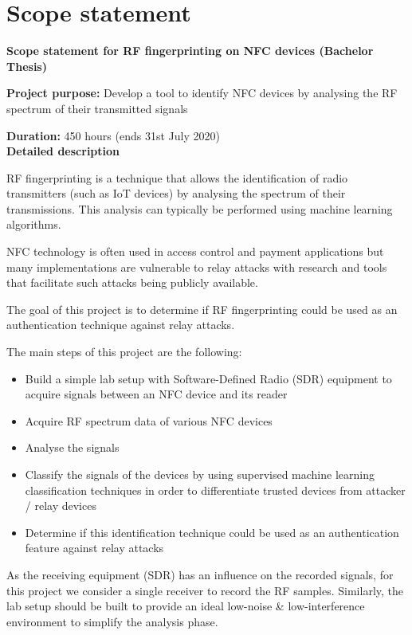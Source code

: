 \section{Scope statement}
{\Large \textbf{Scope statement for RF fingerprinting on NFC devices (Bachelor Thesis)}}

\textbf{Project purpose:}	Develop a tool to identify NFC devices by analysing the RF spectrum of their transmitted signals

\textbf{Duration:}	450 hours (ends 31st July 2020)
\\

\textbf{Detailed description}

RF fingerprinting is a technique that allows the identification of radio transmitters (such as IoT devices) by analysing the spectrum of their transmissions. This analysis can typically be performed using machine learning algorithms.

NFC technology is often used in access control and payment applications but many implementations are vulnerable to relay attacks with research and tools that facilitate such attacks being publicly available.

The goal of this project is to determine if RF fingerprinting could be used as an authentication technique against relay attacks.

The main steps of this project are the following:

\begin{itemize}
  \item Build a simple lab setup with Software-Defined Radio (SDR) equipment to acquire signals between an NFC device and its reader
  \item Acquire RF spectrum data of various NFC devices
  \item Analyse the signals
  \item Classify the signals of the devices by using supervised machine learning classification techniques in order to differentiate trusted devices from attacker / relay devices
  \item Determine if this identification technique could be used as an authentication feature against relay attacks
\end{itemize}

As the receiving equipment (SDR) has an influence on the recorded signals, for this project we consider a single receiver to record the RF samples. Similarly, the lab setup should be built to provide an ideal low-noise \& low-interference environment to simplify the analysis phase.

